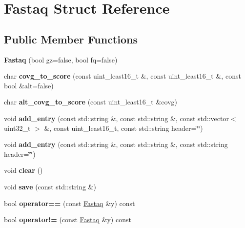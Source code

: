 \hypertarget{structFastaq}{}\section{Fastaq Struct Reference}
\label{structFastaq}
\subsection*{Public Member Functions}
\begin{DoxyCompactItemize}
\item 
\mbox{\label{structFastaq_a3a424145cf661307f00fba0bfada5b8f}} 
{\bfseries Fastaq} (bool gz=false, bool fq=false)
\item 
\mbox{\label{structFastaq_a466ab55b144567b875986f15c3a998f6}} 
char {\bfseries covg\+\_\+to\+\_\+score} (const uint\+\_\+least16\+\_\+t \&, const uint\+\_\+least16\+\_\+t \&, const bool \&alt=false)
\item 
\mbox{\label{structFastaq_a3df41a3171653dfc9260151aa2bbf9b7}} 
char {\bfseries alt\+\_\+covg\+\_\+to\+\_\+score} (const uint\+\_\+least16\+\_\+t \&covg)
\item 
\mbox{\label{structFastaq_ab14499ba7cb45c27c531368f4b7f0ca9}} 
void {\bfseries add\+\_\+entry} (const std\+::string \&, const std\+::string \&, const std\+::vector$<$ uint32\+\_\+t $>$ \&, const uint\+\_\+least16\+\_\+t, const std\+::string header=\char`\"{}\char`\"{})
\item 
\mbox{\label{structFastaq_a155e3ee2b32697bd5083300c1436db56}} 
void {\bfseries add\+\_\+entry} (const std\+::string \&, const std\+::string \&, const std\+::string header=\char`\"{}\char`\"{})
\item 
\mbox{\label{structFastaq_a1aef648a3cc1012bc927bd28ed776e91}} 
void {\bfseries clear} ()
\item 
\mbox{\label{structFastaq_a39795fec87cadd6590d3c296eba45705}} 
void {\bfseries save} (const std\+::string \&)
\item 
\mbox{\label{structFastaq_a0ec35af76f2ea691abf0da4c39ad6cc6}} 
bool {\bfseries operator==} (const \hyperlink{structFastaq}{Fastaq} \&y) const
\item 
\mbox{\label{structFastaq_a6c9894ba5ff6633943d3c536fd396dc5}} 
bool {\bfseries operator!=} (const \hyperlink{structFastaq}{Fastaq} \&y) const
\end{DoxyCompactItemize}
